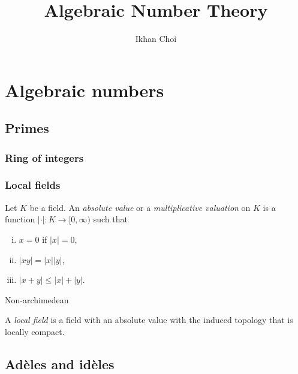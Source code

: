 \documentclass{../../large}
\begin{document}
\title{Algebraic Number Theory}
\author{Ikhan Choi}
\maketitle
\tableofcontents

\part{Algebraic numbers}
\chapter{Primes}
\section{Ring of integers}

\begin{prb}
\end{prb}
\begin{prb}
\end{prb}

\section{Local fields}
\begin{prb}
Let $K$ be a field.
An \emph{absolute value} or a \emph{multiplicative valuation} on $K$ is a function $|\cdot|:K\to[0,\infty)$ such that
\begin{enumerate}[(i)]
\item $x=0$ if $|x|=0$,
\item $|xy|=|x||y|$,
\item $|x+y|\le|x|+|y|$.
\end{enumerate}
Non-archimedean
\end{prb}

\begin{prb}
A \emph{local field} is a field with an absolute value with the induced topology that is locally compact.
\end{prb}

\begin{prb}
\end{prb}

\begin{prb}[Places]
\end{prb}



\chapter{Ad\`eles and id\`eles}
\end{document}
